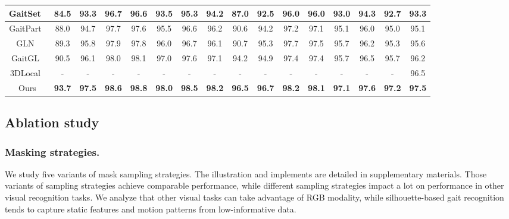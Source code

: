 \documentclass[runningheads]{llncs}
\begin{document}
\begin{table}[htbp]
{\begin{tabular}{cc|c|c|c|c|c|c|c|c|c|c|c|c|c|c}
    \hline
    \multicolumn{1}{c|}{GaitSet~\cite{aaai2019gaitset}} & 84.5  & 93.3  & 96.7  & 96.6  & 93.5  & 95.3  & 94.2  & 87.0  & 92.5  & 96.0  & 96.0  & 93.0  & 94.3  & 92.7  & 93.3   \\
    \hline
    \multicolumn{1}{c|}{GaitPart~\cite{gaitpart}} & 88.0  & 94.7  & 97.7  & 97.6  & 95.5  & 96.6  & 96.2  & 90.6  & 94.2  & 97.2  & 97.1  & 95.1  & 96.0  & 95.0  & 95.1  \\
    \hline
    \multicolumn{1}{c|}{GLN~\cite{gln}}   & 89.3  & 95.8  & 97.9  & 97.8  & 96.0  & 96.7  & 96.1  & 90.7  & 95.3  & 97.7 & 97.5 & 95.7  & 96.2  & 95.3  & 95.6   \\
    \hline
    \multicolumn{1}{c|}{GaitGL~\cite{gaitgl}} & 90.5  & 96.1  & 98.0  & 98.1  & 97.0  & 97.6  & 97.1  & 94.2  & 94.9  & 97.4  & 97.4  & 95.7  & 96.5  & 95.7  & 96.2  \\
    \hline
    \multicolumn{1}{c|}{3DLocal~\cite{3dlocal}} & - & - & - & - & - & - & - & - & - & - & - & - & - & - & 96.5 \\
    \hline
    \multicolumn{1}{c|}{Ours} & \textbf{93.7} & \textbf{97.5} & \textbf{98.6} & \textbf{98.8} & \textbf{98.0} & \textbf{98.5} & \textbf{98.2} & \textbf{96.5} & \textbf{96.7} & \textbf{98.2} & \textbf{98.1} & \textbf{97.1} & \textbf{97.6} & \textbf{97.2} & \textbf{97.5} \\

    \bottomrule
    \end{tabular}%
}

  \label{comparision_oumvlp}%
      \vspace*{-1em}
\end{table}%






\subsection{Ablation study}
\label{sec:ablation}


\subsubsection{Masking strategies.} We study five variants of mask sampling strategies. The illustration and implements are detailed in supplementary materials. Those variants of sampling strategies achieve comparable performance, while different sampling strategies impact a lot on performance in other visual recognition tasks. We analyze that other visual tasks can take advantage of RGB modality, while silhouette-based gait recognition tends to capture static features and motion patterns from low-informative data.
\end{document}
